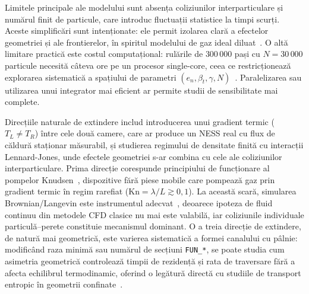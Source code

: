 \documentclass[12pt,openright,twoside]{book}
\renewcommand{\contentsname}{{\Huge Cuprins}}
\begin{document}
Limitele principale ale modelului sunt absența coliziunilor interparticulare și numărul finit de particule, care introduc fluctuații statistice la timpi scurți. Aceste simplificări sunt intenționate: ele permit izolarea clară a efectelor geometriei și ale frontierelor, în spiritul modelului de gaz ideal diluat~\cite{reif2009,cercignani1988}. O altă limitare practică este costul computațional: rulările de $300\,000$ pași cu $N = 30\,000$ particule necesită câteva ore pe un procesor single-core, ceea ce restricționează explorarea sistematică a spațiului de parametri $(e_n, \beta_t, \gamma, N)$~\cite{allen2017,frenkel2002}. Paralelizarea sau utilizarea unui integrator mai eficient ar permite studii de sensibilitate mai complete.

Direcțiile naturale de extindere includ introducerea unui gradient termic ($T_L \neq T_R$) între cele două camere, care ar produce un NESS real cu flux de căldură staționar măsurabil, și studierea regimului de densitate finită cu interacții Lennard-Jones, unde efectele geometriei s-ar combina cu cele ale coliziunilor interparticulare. Prima direcție corespunde principiului de funcționare al pompelor Knudsen~\cite{knudsen1909}, dispozitive fără piese mobile care pompează gaz prin gradient termic în regim rarefiat ($\text{Kn} = \lambda/L \gtrsim 0{,}1$). La această scară, simularea Brownian/Langevin este instrumentul adecvat~\cite{cercignani1988,karniadakis2005}, deoarece ipoteza de fluid continuu din metodele CFD clasice nu mai este valabilă, iar coliziunile individuale particulă--perete constituie mecanismul dominant. O a treia direcție de extindere, de natură mai geometrică, este varierea sistematică a formei canalului cu pâlnie: modificând raza minimă sau numărul de secțiuni \texttt{FUN\_*}, se poate studia cum asimetria geometrică controlează timpii de rezidență și rata de traversare fără a afecta echilibrul termodinamic, oferind o legătură directă cu studiile de transport entropic în geometrii confinate~\cite{squires2005,hanggi2009}.

\renewcommand{\contentsname}{Referințe}
\renewcommand\bibname{Referințe}


\end{document}
